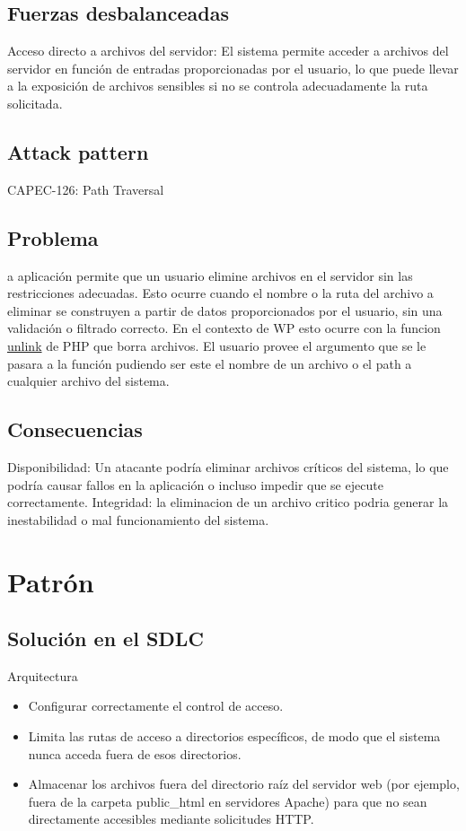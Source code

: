 \subsection{Fuerzas desbalanceadas}
Acceso directo a archivos del servidor: El sistema permite acceder a archivos del servidor en función de entradas proporcionadas por el usuario, lo que puede llevar a la exposición de archivos sensibles si no se controla adecuadamente la ruta solicitada.

\subsection{Attack pattern}
CAPEC-126: Path Traversal
\subsection{Problema}
a aplicación permite que un usuario elimine archivos en el servidor sin las restricciones adecuadas. Esto ocurre cuando el nombre o la ruta del archivo a eliminar se construyen a partir de datos proporcionados por el usuario, sin una validación o filtrado correcto.
En el contexto de WP esto ocurre con la funcion \href{https://www.php.net/unlink}{unlink} de PHP que borra archivos. El usuario provee el argumento que se le pasara a la función pudiendo ser este el nombre de un archivo o el path a cualquier archivo del sistema.
\subsection{Consecuencias}
Disponibilidad: Un atacante podría eliminar archivos críticos del sistema, lo que podría causar fallos en la aplicación o incluso impedir que se ejecute correctamente.
Integridad: la eliminacion de un archivo critico podria generar la inestabilidad o mal funcionamiento del sistema.
\section{Patrón}
\subsection{Solución en el SDLC}

Arquitectura
\begin{itemize}
    \item Configurar correctamente el control de acceso.
    \item Limita las rutas de acceso a directorios específicos, de modo que el sistema nunca acceda fuera de esos directorios.
    \item Almacenar los archivos fuera del directorio raíz del servidor web (por ejemplo, fuera de la carpeta public\_html en servidores Apache) para que no sean directamente accesibles mediante solicitudes HTTP.
\end{itemize}

